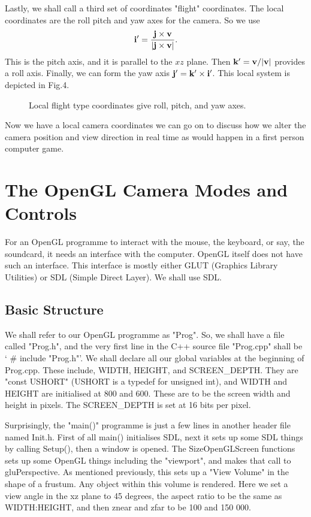 \documentclass[12pt]{article}
\begin{document}
Lastly, we shall call a third set of coordinates "flight" coordinates.
The local coordinates are the roll pitch and yaw axes for the camera.
So we use
\begin{equation}
{\bf i}^\prime=\frac{ {\bf j} \times {\bf v}} 
{\vert {\bf j} \times  {\bf v} \vert}.
\end{equation}
This is the pitch axis, and it is parallel to the $xz$ plane.
Then ${\bf k}^\prime={\bf v} / \vert {\bf v} \vert$ provides
a roll axis. Finally, we can form the 
yaw axis ${\bf j}^\prime={\bf k}^\prime \times {\bf i}^\prime$.
This local system is depicted in Fig.4.
\begin{figure}[htb]
\vspace*{10cm}
\caption{ 
Local flight type coordinates give roll, pitch, and yaw axes.
}
\end{figure}
Now we have a local camera coordinates we can go on to discuss
how we alter the camera position and view direction in real time
as would happen in a first person computer game.
 

\section{The OpenGL Camera Modes and  Controls}

For an OpenGL programme to interact with the mouse, the 
keyboard, or say, the soundcard, it needs an interface with 
the computer.
OpenGL itself does not have such an interface.
This interface is mostly either GLUT (Graphics Library 
Utilities) or SDL (Simple Direct Layer). We shall use SDL. 

\subsection{Basic Structure}

We shall  refer to our OpenGL programme as "Prog". So,
we shall have a file called "Prog.h", and the very first
line in the C++ source file "Prog.cpp" shall be ` \# include "Prog.h"'.
 We shall declare all our
global variables at the beginning of Prog.cpp. 
These include, WIDTH,  HEIGHT, and SCREEN\_DEPTH.
They are "const USHORT" (USHORT is a typedef for unsigned int), and 
WIDTH and HEIGHT are initialised
at 800 and 600. These are to be the screen width and
height in pixels. The SCREEN\_DEPTH is set at 16 bits per pixel.

Surprisingly, the "main()" programme is just a few lines
in another header file  named Init.h. First of all main() initialises
SDL, next  it sets up some SDL things by calling Setup(), 
then a window is opened. The SizeOpenGLScreen functions
sets up some OpenGL things including the "viewport",
 and makes that  call to gluPerspective.  As mentioned previously,
this sets up a 
 "View Volume" in the shape of a frustum.
Any object within this volume  is rendered. Here we set
 a view angle in the xz plane to 45 degrees, the aspect ratio
 to be the same as WIDTH:HEIGHT,
and then znear and zfar to be 100 and 150 000.
\end{document}
